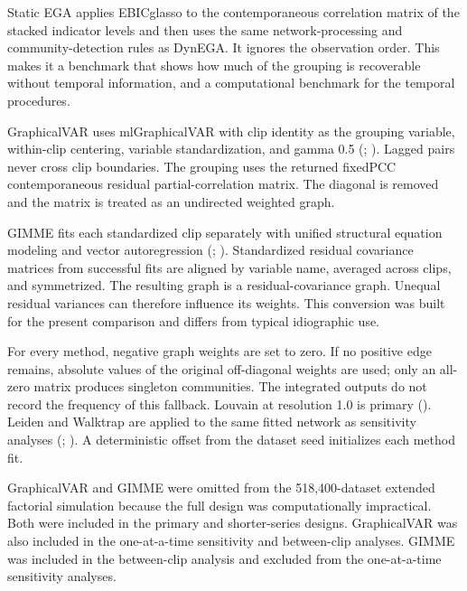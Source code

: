 \documentclass[
]{article}
\begin{document}
Static EGA applies EBICglasso to the contemporaneous correlation matrix
of the stacked indicator levels and then uses the same
network-processing and community-detection rules as DynEGA. It ignores
the observation order. This makes it a benchmark that shows how much of
the grouping is recoverable without temporal information, and a
computational benchmark for the temporal procedures.

GraphicalVAR uses mlGraphicalVAR with clip identity as the grouping
variable, within-clip centering, variable standardization, and gamma 0.5
(;
). Lagged pairs never
cross clip boundaries. The grouping uses the returned fixedPCC
contemporaneous residual partial-correlation matrix. The diagonal is
removed and the matrix is treated as an undirected weighted graph.

GIMME fits each standardized clip separately with unified structural
equation modeling and vector autoregression
(;
). Standardized
residual covariance matrices from successful fits are aligned by
variable name, averaged across clips, and symmetrized. The resulting
graph is a residual-covariance graph. Unequal residual variances can
therefore influence its weights. This conversion was built for the
present comparison and differs from typical idiographic use.

For every method, negative graph weights are set to zero. If no positive
edge remains, absolute values of the original off-diagonal weights are
used; only an all-zero matrix produces singleton communities. The
integrated outputs do not record the frequency of this fallback. Louvain
at resolution 1.0 is primary (). Leiden and Walktrap are applied to the same fitted network
as sensitivity analyses (; ). A
deterministic offset from the dataset seed initializes each method fit.

GraphicalVAR and GIMME were omitted from the 518,400-dataset extended
factorial simulation because the full design was computationally
impractical. Both were included in the primary and shorter-series
designs. GraphicalVAR was also included in the one-at-a-time sensitivity
and between-clip analyses. GIMME was included in the between-clip
analysis and excluded from the one-at-a-time sensitivity analyses.
\end{document}
